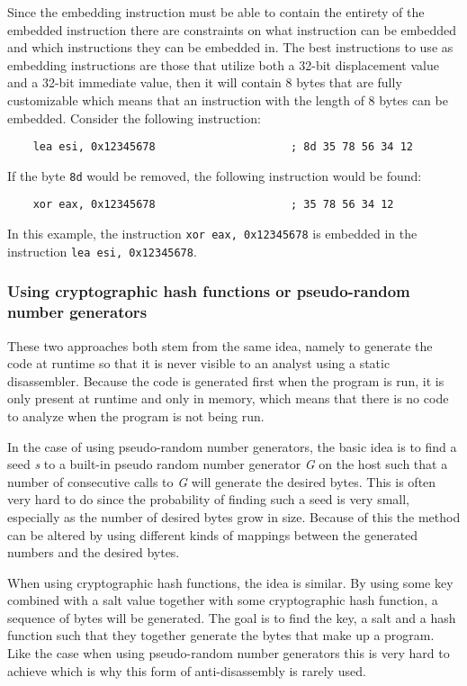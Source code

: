 \documentclass[11pt,twoside]{eitExjobb}
\begin{document}
Since the embedding instruction must be able to contain the entirety of the embedded instruction there are constraints on what instruction can be embedded and which instructions they can be embedded in. The best instructions to use as embedding instructions are those that utilize both a 32-bit displacement value and a 32-bit immediate value, then it will contain 8 bytes that are fully customizable which means that an instruction with the length of 8 bytes can be embedded. Consider the following instruction:

\begin{verbatim}
    lea esi, 0x12345678                     ; 8d 35 78 56 34 12
\end{verbatim}

\noindent If the byte \texttt{8d} would be removed, the following instruction would be found:

\begin{verbatim}
    xor eax, 0x12345678                     ; 35 78 56 34 12
\end{verbatim}

\noindent In this example, the instruction \texttt{xor eax, 0x12345678} is embedded in the instruction \texttt{lea esi, 0x12345678}.




\subsubsection{Using cryptographic hash functions or pseudo-random number generators}
These two approaches both stem from the same idea, namely to generate the code at runtime so that it is never visible to an analyst using a static disassembler. Because the code is generated first when the program is run, it is only present at runtime and only in memory, which means that there is no code to analyze when the program is not being run.

In the case of using pseudo-random number generators, the basic idea is to find a seed \emph{s} to a built-in pseudo random number generator \emph{G} on the host such that a number of consecutive calls to \emph{G} will generate the desired bytes. This is often very hard to do since the probability of finding such a seed is very small, especially as the number of desired bytes grow in size. Because of this the method can be altered by using different kinds of mappings between the generated numbers and the desired bytes.\cite{prng}

When using cryptographic hash functions, the idea is similar. By using some key combined with a salt value together with some cryptographic hash function, a sequence of bytes will be generated. The goal is to find the key, a salt and a hash function such that they together generate the bytes that make up a program. Like the case when using pseudo-random number generators this is very hard to achieve which is why this form of anti-disassembly is rarely used.\cite{chf}
\end{document}
